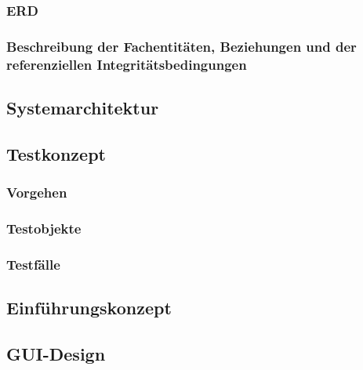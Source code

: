 \subsubsection{ERD}
\subsubsection{Beschreibung der Fachentitäten, Beziehungen und der referenziellen Integritätsbedingungen}
\subsection{Systemarchitektur}
\subsection{Testkonzept}
\subsubsection{Vorgehen}
\subsubsection{Testobjekte}
\subsubsection{Testfälle}
\subsection{Einführungskonzept}
\subsection{GUI-Design}
